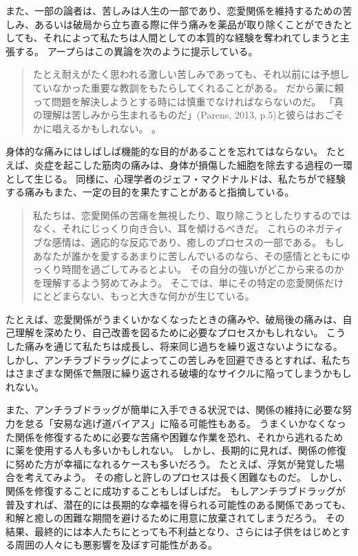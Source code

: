 \documentclass[paper=a4,book,openany]{jlreq}
\newcommand{\ig}[1]{}           %
\begin{document}
また、一部の論者は、苦しみは人生の一部であり、恋愛関係を維持するための苦しみ、あるいは破局から立ち直る際に伴う痛みを薬品が取り除くことができたとしても、それによって私たちは人間としての本質的な経験を奪われてしまうと主張する。
アープらはこの異論を次のように提示している。

\begin{quote}
たとえ耐えがたく思われる激しい苦しみであっても、それ以前には予想していなかった重要な教訓をもたらしてくれることがある。
だから薬に頼って問題を解決しようとする時には慎重でなければならないのだ。
「真の理解は苦しみから生まれるものだ」(Parens, 2013, p.5)\ig{Parens}と彼らはおごそかに唱えるかもしれない。
\citep[p.12]{earp13:_if_i_could_just_stop_lovin_you}\nocite{parens13:_good_bad_forms_medic}。
\end{quote}

身体的な痛みにはしばしば機能的な目的があることを忘れてはならない。
たとえば、炎症を起こした筋肉の痛みは、身体が損傷した細胞を除去する過程の一環として生じる。
同様に、心理学者のジェフ・マクドナルド\ig{(Geoff MacDonald)}は、私たちがで経験する痛みもまた、一定の目的を果たすことがあると指摘している。

\begin{quote}
私たちは、恋愛関係の苦痛を無視したり、取り除こうとしたりするのではなく、それにじっくり向き合い、耳を傾けるべきだ。
これらのネガティブな感情は、適応的な反応であり、癒しのプロセスの一部である。
もしあなたが誰かを愛するあまりに苦しんでいるのなら、その感情とともにゆっくり時間を過ごしてみるとよい。
その自分の強いがどこから来るのかを理解するよう努めてみよう。
そこでは、単にその特定の恋愛関係だけにとどまらない、もっと大きな何かが生じている。
\citep{lawson17:_why_does_love_hurt_so_much}
\end{quote}

たとえば、恋愛関係がうまくいかなくなったときの痛みや、破局後の痛みは、自己理解を深めたり、自己改善を図るために必要なプロセスかもしれない。
こうした痛みを通じて私たちは成長し、将来同じ過ちを繰り返さないようになる。
しかし、アンチラブドラッグによってこの苦しみを回避できるとすれば、私たちはさまざまな関係で無限に繰り返される破壊的なサイクルに陥ってしまうかもしれない。

また、アンチラブドラッグが簡単に入手できる状況では、関係の維持に必要な努力を怠る「安易な逃げ道バイアス」に陥る可能性もある。
うまくいかなくなった関係を修復するために必要な苦痛や困難な作業を恐れ、それから逃れるために薬を使用する人も多いかもしれない。
しかし、長期的に見れば、関係の修復に努めた方が幸福になれるケースも多いだろう。
たとえば、浮気が発覚した場合を考えてみよう。
その癒しと許しのプロセスは長く困難なものだ。
しかし、関係を修復することに成功することもしばしばだ。
もしアンチラブドラッグが普及すれば、潜在的には長期的な幸福を得られる可能性のある関係であっても、和解と癒しの困難な期間を避けるために用意に放棄されてしまうだろう。
その結果、最終的には本人たちにとっても不利益となり、さらには子供をはじめとする周囲の人々にも悪影響を及ぼす可能性がある。
\end{document}
